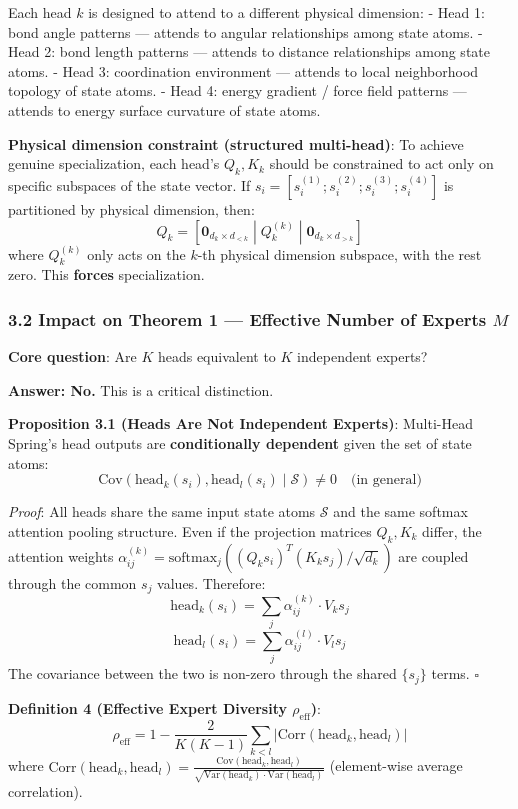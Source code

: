 \documentclass[
  12pt,
]{article}
\begin{document}
Each head $k$ is designed to attend to a different physical dimension:
- Head 1: bond angle patterns --- attends to angular relationships among state atoms.
- Head 2: bond length patterns --- attends to distance relationships among state atoms.
- Head 3: coordination environment --- attends to local neighborhood topology of state atoms.
- Head 4: energy gradient / force field patterns --- attends to energy surface curvature of state atoms.

\textbf{Physical dimension constraint (structured multi-head)}: To achieve genuine specialization, each head's $Q_k, K_k$ should be constrained to act only on specific subspaces of the state vector. If $s_i = [s_i^{(1)}; s_i^{(2)}; s_i^{(3)}; s_i^{(4)}]$ is partitioned by physical dimension, then:
\[Q_k = [\mathbf{0}_{d_k \times d_{<k}} \;|\; Q_k^{(k)} \;|\; \mathbf{0}_{d_k \times d_{>k}}]\]
where $Q_k^{(k)}$ only acts on the $k$-th physical dimension subspace, with the rest zero. This \textbf{forces} specialization.

\subsubsection{3.2 Impact on Theorem 1 --- Effective Number of Experts $M$}\label{impact-on-thm-1-effective-M}

\textbf{Core question}: Are $K$ heads equivalent to $K$ independent experts?

\textbf{Answer: No.} This is a critical distinction.

\textbf{Proposition 3.1 (Heads Are Not Independent Experts)}: Multi-Head Spring's head outputs are \textbf{conditionally dependent} given the set of state atoms:
\[\text{Cov}(\text{head}_k(s_i), \text{head}_l(s_i) \mid \mathcal{S}) \neq 0 \quad \text{(in general)}\]

\emph{Proof}: All heads share the same input state atoms $\mathcal{S}$ and the same softmax attention pooling structure. Even if the projection matrices $Q_k, K_k$ differ, the attention weights $\alpha_{ij}^{(k)} = \text{softmax}_j((Q_k s_i)^T (K_k s_j) / \sqrt{d_k})$ are coupled through the common $s_j$ values. Therefore:
\[\text{head}_k(s_i) = \sum_j \alpha_{ij}^{(k)} \cdot V_k s_j\]
\[\text{head}_l(s_i) = \sum_j \alpha_{ij}^{(l)} \cdot V_l s_j\]
The covariance between the two is non-zero through the shared $\{s_j\}$ terms. $\square$

\textbf{Definition 4 (Effective Expert Diversity $\rho_{\text{eff}}$)}:
\[\boxed{\rho_{\text{eff}} = 1 - \frac{2}{K(K-1)} \sum_{k < l} |\text{Corr}(\text{head}_k, \text{head}_l)|}\]
where $\text{Corr}(\text{head}_k, \text{head}_l) = \frac{\text{Cov}(\text{head}_k, \text{head}_l)}{\sqrt{\text{Var}(\text{head}_k) \cdot \text{Var}(\text{head}_l)}}$ (element-wise average correlation).
\end{document}
